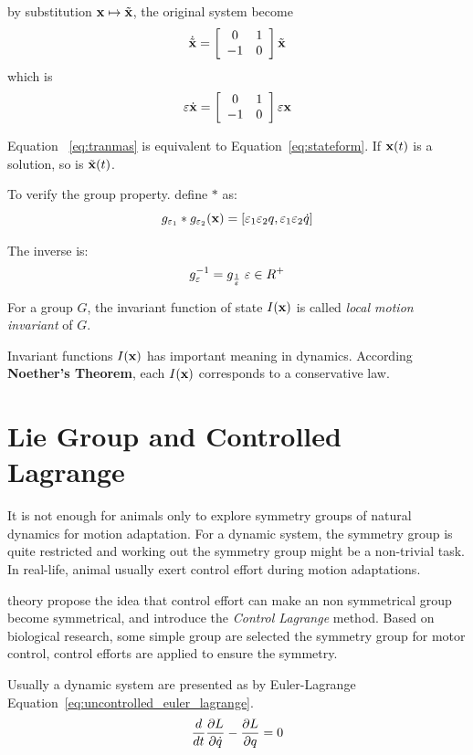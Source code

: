 by substitution $\mathbf{x} \mapsto \tilde{\mathbf{x}}$, the original system become
\[ 
\dot{\tilde{\mathbf{x}}}=
\left[ 
\begin{array}{cc}
0 &1\\
-1 &0 
\end{array}
\right]\tilde{\mathbf{x}}
\]
which is 
\begin{equation}
\label{eq:tranmas} 
\varepsilon \dot{\mathbf{x}}=
\left[ 
\begin{array}{cc}
0 &1\\
-1 &0 
\end{array}
\right]\varepsilon \mathbf{x}
\end{equation}

Equation ~\ref{eq:tranmas} is equivalent to  Equation~\ref{eq:stateform}.
If $\mathbf{x}(t)$ is a solution, so is $\tilde{\mathbf{x}}(t)$.

To verify the group property. define $*$ as:
\[
g_{\varepsilon_1}*g_{\varepsilon_2}(\mathbf{x})=[\varepsilon_1 \varepsilon_2 q, \varepsilon_1 \varepsilon_2 \dot{q}]
\]

The inverse is:
\[
g_{\varepsilon}^{-1}=g_{\frac{1}{\varepsilon}} \;\varepsilon \in R^+
\]

\begin{mydef}
For a group $G$, the invariant function of state $I(\mathbf{x})$ is called \emph{local motion invariant} of $G$. 
\end{mydef}

Invariant functions $I(\mathbf{x})$ has important  meaning in dynamics. 
According  \textbf{Noether's Theorem}, each $I(\mathbf{x})$ corresponds to a conservative law. 


\section{Lie Group and Controlled Lagrange}
\label{sec:liecontrol}
It is not enough for animals  only to  explore symmetry groups of natural dynamics for motion adaptation.
For a dynamic system, the symmetry group is quite restricted and  working out the symmetry group might be a non-trivial task.
In real-life, animal usually exert control effort during motion adaptations.

\moit theory propose the idea that control effort can make an non symmetrical group become symmetrical, and introduce the \emph{Control Lagrange} method.
Based on biological research\citep{flash2007affine}, some simple group are selected the symmetry group for motor control,
control efforts are applied to ensure the symmetry.


Usually a dynamic system are presented as by Euler-Lagrange Equation~\ref{eq:uncontrolled_euler_lagrange}\citep{Goldstein2002}.
\begin{equation}
\frac{d}{dt} \frac{\partial L}{\partial \dot{q}} - \frac{\partial L}{\partial q} = 0
\label{eq:uncontrolled_euler_lagrange}
\end{equation}

